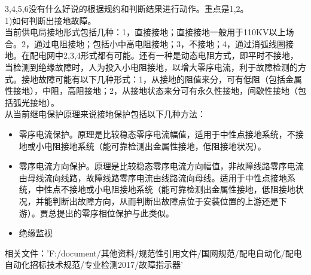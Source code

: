\documentclass{article}
\begin{document}
\begin{CJK}{UTF8}{gbsn}
\begin{enumerate}
	3,4,5,6没有什么好说的根据规约和判断结果进行动作。重点是1,2。\\
	1)如何判断出接地故障。\\
	当前供电局接地形式包括几种：1，直接接地；直接接地一般用于110KV以上场合。2，通过电阻接地；包括小中高电阻接地；3，不接地；4，通过消弧线圈接地。在配电网中2,3,4形式都有可能。还有一种是动态电阻方式，即平时不接地，当检测到绝缘故障时，人为投入小电阻接地，以增大零序电流，利于故障检测的方式。接地故障可能有以下几种形式：1，从接地的阻值来分，可有低阻（包括金属性接地），中阻，高阻接地；2，从接地状态来分可有永久性接地，间歇性接地（包括弧光接地）。\\
	从当前继电保护原理来说接地保护包括以下几种方法：
	\begin{itemize}
			\item 零序电流保护。原理是比较稳态零序电流幅值，适用于中性点接地系统，不接地或小电阻接地系统（能可靠检测出金属性接地，低阻接地状况）。
			\item 零序电流方向保护。原理是比较稳态零序电流方向幅值，非故障线路零序电流由母线流向线路，故障线路零序电流由线路流向母线。适用于中性点接地系统，中性点不接地或小电阻接地系统（能可靠检测出金属性接地，低阻接地状况，并能判断出故障方向，从而判断出故障点位于安装位置的上游还是下游）。贾总提出的零序相位保护与此类似。
			\item 绝缘监视
	\end{itemize}




\end{enumerate}

相关文件：'F:/document/其他资料/规范性引用文件/国网规范/配电自动化/配电自动化招标技术规范/专业检测2017/故障指示器'
\end{CJK}
\end{document}
